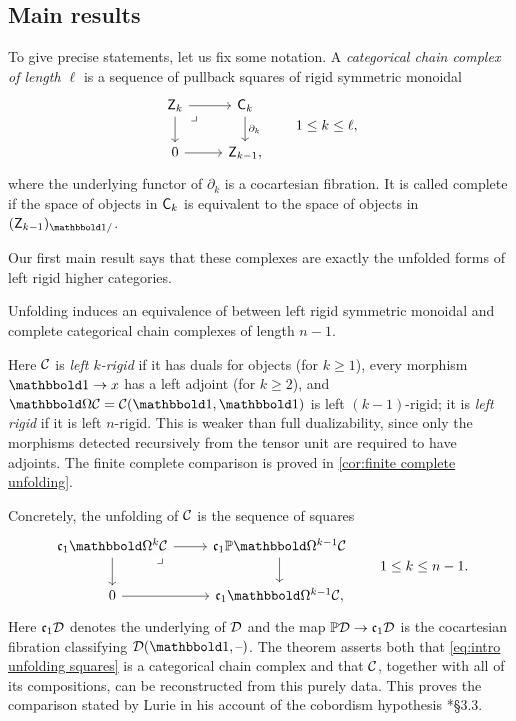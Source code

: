 \documentclass[a4paper,11pt]{article}
\begin{document}
\subsection*{Main results}

To give precise statements, let us fix some notation. 
A \emph{categorical chain complex of length $\ell$} is a sequence of
pullback squares of rigid symmetric monoidal \icats{}
\begin{equation}\label{eq:intro categorical chain complex}
  \begin{tikzcd}
    \oZ_{k} \drpullback \ar[r] \ar[d]
      & \oC_{k} \ar[d,"\partial_{k}"] \\
    0 \ar[r] & \oZ_{k-1},
  \end{tikzcd}
  \qquad 1\leq k\leq\ell,
\end{equation}
where the underlying functor
of $\partial_{k}$ is a cocartesian fibration.  It is called complete if the space of objects
in $\textup{\textsf{C}}_{k}$ is equivalent to the space of objects in $(\oZ_{k-1})_{\bbone/}$.

Our first main result says that these complexes are exactly the
unfolded forms of left rigid higher categories.
\begin{theoremint}\label{introthm:complete}
  Unfolding induces an equivalence of \icats{} between left rigid
  symmetric monoidal \incats{} and complete categorical chain
  complexes of length $n-1$.
\end{theoremint}
Here $\mathcal{C}$ is \emph{left $k$-rigid} if it has duals for objects (for
$k\geq1$), every morphism $\bbone\to x$ has a left adjoint (for
$k\geq2$), and $\mOm\nC = \nC(\bbone,\bbone)$ is left $(k-1)$-rigid; it is \emph{left
  rigid} if it is left $n$-rigid.  This is weaker than full
dualizability, since only the morphisms detected recursively from the
tensor unit are required to have adjoints.
The finite complete comparison is proved in
\cref{cor:finite complete unfolding}.

Concretely, the unfolding of $\mathcal{C}$ is the sequence of squares
\begin{equation}\label{eq:intro unfolding squares}
  \begin{tikzcd}
    \core\mOm^{k}\nC \drpullback \ar[r] \ar[d]
      & \core\mP\mOm^{k-1}\nC \ar[d] \\
    0 \ar[r] & \core\mOm^{k-1}\nC,
  \end{tikzcd}
  \qquad 1\leq k\leq n-1.
\end{equation}
Here $\mathfrak{c}_{1}\mathcal{D}$ denotes the underlying \icat{} of $\mathcal{D}$ and the map $\mP\nD\to\core\nD$ is the
cocartesian fibration classifying $\nD(\bbone,\blank)$.  The theorem
asserts both that
\cref{eq:intro unfolding squares} is a categorical chain complex and
that $\mathcal{C}$, together with all of its compositions, can be reconstructed
from this purely \icatl{} data.  This proves the comparison stated by
Lurie in his account of the cobordism hypothesis
\cite{LurieCob}*{\S3.3}.
\end{document}
